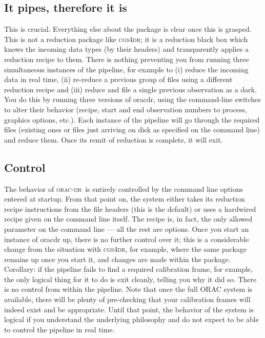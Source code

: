 \documentclass[twoside,11pt]{article}
\newcommand{\xref}[3]{#1}
\renewcommand{\_}{\texttt{\symbol{95}}}
\newcommand{\oracdr}{\textsc{orac-dr}}
\newcommand{\cgsdr}{\xref{{\textsc{cgs4dr}}}{sun27}{}}
\begin{document}
\subsection*{It pipes, therefore it is}

This is crucial. Everything else about the package is clear once this
is grasped. This is not a reduction package like \cgsdr; it is a
reduction black box which knows the incoming data types (by their
headers) and transparently applies a reduction recipe to them. There
is nothing preventing you from running three simultaneous instances of
the pipeline, for example to (i) reduce the incoming data in real
time, (ii) re-reduce a previous group of files using a different
reduction recipe and (iii) reduce and file a single previous
observation as a dark. You do this by running three versions of
oracdr, using the command-line switches to alter their behavior
(recipe, start and end observation numbers to process, graphics
options, etc.). Each instance of the pipeline will go through the
required files (existing ones or files just arriving on disk as
specified on the command line) and reduce them. Once its remit of
reduction is complete, it will exit.

\subsection*{Control}

The behavior of \oracdr\ is entirely controlled by the command line
options entered at startup. From that point on, the system either
takes its reduction recipe instructions from the file headers (this is
the default) or uses a hardwired recipe given on the command line
itself. The recipe is, in fact, the only allowed parameter on the
command line --- all the rest are options. Once you start an instance of
oracdr up, there is no further control over it; this is a considerable
change from the situation with \cgsdr, for example, where the same
package remains up once you start it, and changes are made within the
package. Corollary: if the pipeline fails to find a required
calibration frame, for example, the only logical thing for it to do is
exit cleanly, telling you why it did so. There is no control from
within the pipeline. Note that once the full ORAC system is available,
there will be plenty of pre-checking that your calibration frames will
indeed exist and be appropriate. Until that point, the behavior of
the system is logical if you understand the underlying philosophy and
do not expect to be able to control the pipeline in real time.
\end{document}
